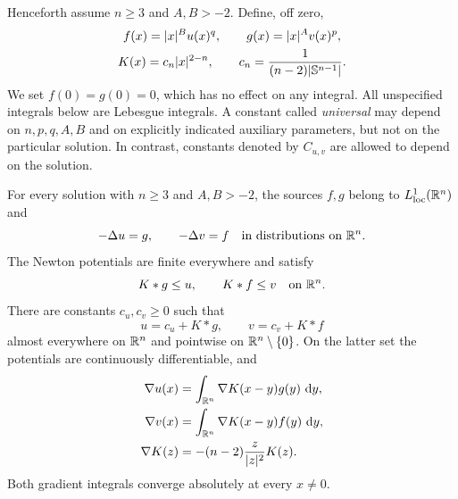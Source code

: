 Henceforth assume $n\ge3$ and $A,B>-2$.  Define, off zero,
\begin{equation}\label{eq:sources-kernel}
 \begin{gathered}
 f(x)=|x|^B u(x)^q,\qquad g(x)=|x|^A v(x)^p,\\
 K(x)=c_n|x|^{2-n},\qquad c_n=\frac1{(n-2)|\mathbb S^{n-1}|}.
 \end{gathered}
\end{equation}
We set $f(0)=g(0)=0$, which has no effect on any integral.  All unspecified
integrals below are Lebesgue integrals.  A constant called \emph{universal}
may depend on $n,p,q,A,B$ and on explicitly indicated auxiliary parameters,
but not on the particular solution.  In contrast, constants denoted by
$C_{u,v}$ are allowed to depend on the solution.

\begin{lemma}\label{lem:potential}
For every solution with $n\ge3$ and $A,B>-2$, the sources $f,g$ belong to
$L^1_{\mathrm{loc}}(\mathbb R^n)$ and
\[
 -\Delta u=g,\qquad -\Delta v=f
 \quad\hbox{in distributions on }\mathbb R^n.
\]
The Newton potentials are finite everywhere and satisfy
\begin{equation}\label{eq:potential-lower}
 K*g\le u,\qquad K*f\le v \quad\hbox{on }\mathbb R^n.
\end{equation}
There are constants $c_u,c_v\ge0$ such that
\begin{equation}\label{eq:potential-constants}
 u=c_u+K*g,\qquad v=c_v+K*f
\end{equation}
almost everywhere on $\mathbb R^n$ and pointwise on $\mathbb R^n\setminus\{0\}$.
On the latter set the potentials are continuously differentiable, and
\begin{equation}\label{eq:potential-gradients}
 \begin{split}
 \nabla u(x)&=\int_{\mathbb R^n}\nabla K(x-y)g(y)\,\,\mathrm d y,\\
 \nabla v(x)&=\int_{\mathbb R^n}\nabla K(x-y)f(y)\,\,\mathrm d y,\\
 \nabla K(z)&=-(n-2)\frac{z}{|z|^2}K(z).
 \end{split}
\end{equation}
Both gradient integrals converge absolutely at every $x\ne0$.
\end{lemma}

